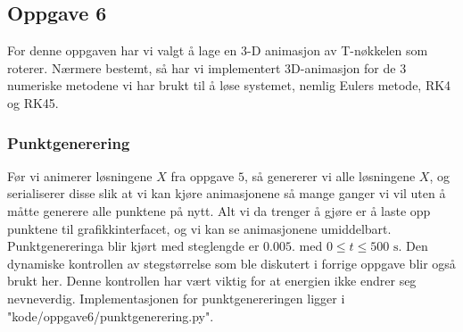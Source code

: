 \subsection{Oppgave 6}
For denne oppgaven har vi valgt å lage en 3-D animasjon av T-nøkkelen som roterer. Nærmere bestemt, så har vi implementert 3D-animasjon for de $3$ numeriske metodene vi har brukt til å løse systemet, nemlig Eulers metode, RK4 og RK45.

\subsubsection{Punktgenerering}
Før vi animerer løsningene $X$ fra oppgave $5$, så genererer vi alle løsningene $X$, og serialiserer disse slik at vi kan kjøre animasjonene så mange ganger vi vil uten å måtte generere alle punktene på nytt. Alt vi da trenger å gjøre er å laste opp punktene til grafikkinterfacet, og vi kan se animasjonene umiddelbart. Punktgenereringa blir kjørt med steglengde er $0.005.$ med $0\leq t \leq 500\text{ s}.$ Den dynamiske kontrollen av stegstørrelse som ble diskutert i forrige oppgave blir også brukt her. Denne kontrollen har vært viktig for at energien ikke endrer seg nevneverdig. Implementasjonen for punktgenereringen ligger i "kode/oppgave6/punktgenerering.py".

